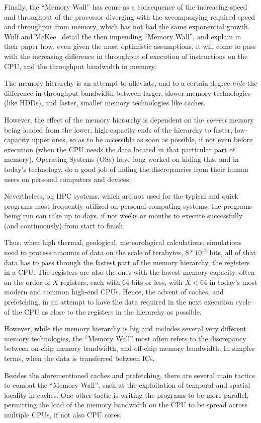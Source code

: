 Finally, the ``Memory Wall'' has come as a consequence of the increasing speed and throughput of the processor diverging with the accompanying required speed and throughput from memory, which has not had the same exponential growth.
Wulf and McKee~\cite{Wulf:1995:HMW:216585.216588} detail the then impending ``Memory Wall'', and explain in their paper how, even given the most optimistic assumptions, it will come to pass with the increasing difference in throughput of execution of instructions on the CPU, and the throughput bandwidth in memory.

The memory hierarchy is an attempt to alleviate, and to a certain degree \textit{hide} the difference in throughput bandwidth between larger, slower memory technologies (like HDDs), and faster, smaller memory technologies like caches.

However, the effect of the memory hierarchy is dependent on the \textit{correct} memory being loaded from the lower, high-capacity ends of the hierarchy to faster, low-capacity upper ones, so as to be accessible as soon as possible, if not even before execution (when the CPU needs the data located in that particular part of memory).
Operating Systems (OSs) have long worked on hiding this, and in today's technology, do a good job of hiding the discrepancies from their human users on personal computers and devices.

Nevertheless, on HPC systems, which are not used for the typical and quick programs most frequently utilized on personal computing systems, the programs being run can take up to days, if not weeks or months to execute successfully (and continuously) from start to finish.

Thus, when high thermal, geological, meteorological calculations, simulations need to process amounts of data on the scale of terabytes, $8*10^{12}$ bits, all of that data has to pass through the fastest part of the memory hierarchy, the registers in a CPU.
The registers are also the ones with the lowest memory capacity, often on the order of $X$ registers, each with $64$ bits or less, with $X < 64$ in today's most modern and common high-end CPUs.
Hence, the advent of caches, and prefetching, in an attempt to have the data required in the next execution cycle of the CPU as close to the registers in the hierarchy as possible.

However, while the memory hierarchy is big and includes several very different memory technologies, the ``Memory Wall'' most often refers to the discrepancy between on-chip memory bandwidth, and off-chip memory bandwidth.
In simpler terms, when the data is transferred between ICs.

Besides the aforementioned caches and prefetching, there are several main tactics to combat the ``Memory Wall'', such as the exploitation of temporal and spatial locality in caches. One other tactic is writing the programs to be more parallel, permitting the load of the memory bandwidth on the CPU to be spread across multiple CPUs, if not also CPU cores.
